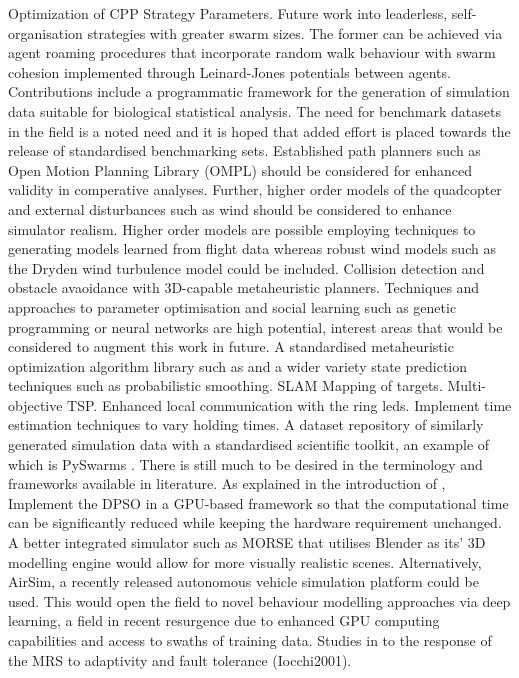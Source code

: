\documentclass{report}
\begin{document}
Optimization of CPP Strategy Parameters. Future work into leaderless, self-organisation strategies with greater swarm sizes. The former can be achieved via agent roaming procedures that incorporate random walk behaviour with swarm cohesion implemented through Leinard-Jones potentials between agents.
Contributions include a programmatic framework for the generation of simulation data suitable for biological statistical analysis. The need for benchmark datasets in the field is a noted need and it is hoped that added effort is placed towards the release of standardised benchmarking sets.
Established path planners such as Open Motion Planning Library (OMPL) \cite{Sucan2012} should be considered for enhanced validity in comperative analyses. Further, higher order models of the quadcopter and external disturbances such as wind should be considered to enhance simulator realism. Higher order models are possible employing techniques to generating models learned from flight data \cite{Symington2014} whereas robust wind models such as the Dryden wind turbulence model \cite{Dryden} could be included. Collision detection and obstacle avaoidance with 3D-capable metaheuristic planners. Techniques and approaches to parameter optimisation and social learning such as genetic programming or neural networks are high potential, interest areas that would be considered to augment this work in future.
A standardised metaheuristic optimization algorithm library such as \cite{James2018} and a wider variety state prediction techniques such as probabilistic smoothing.
SLAM Mapping of targets.
Multi-objective TSP.
Enhanced local communication with the ring leds.
Implement time estimation techniques to vary holding times.
A dataset repository of similarly generated simulation data with a standardised scientific toolkit, an example of which is PySwarms \cite{James2018}.
There is still much to be desired in the terminology and frameworks available in literature.
As explained in the introduction of \cite{Phung2017}, Implement the DPSO in a GPU-based framework so that the computational time can be significantly reduced while keeping the hardware requirement unchanged.
A better integrated simulator such as MORSE that utilises Blender as its' 3D modelling engine would allow for more visually realistic scenes. Alternatively, AirSim, a recently released autonomous vehicle simulation platform could be used. This would open the field to novel behaviour modelling approaches via deep learning, a field in recent resurgence due to enhanced GPU computing capabilities and access to swaths of training data.
Studies in to the response of the MRS to adaptivity and fault tolerance (Iocchi2001).
\end{document}
